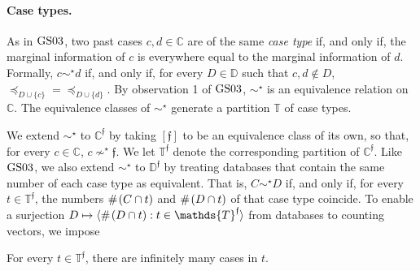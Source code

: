 \documentclass[12pt,a4paper,twoside]{article}
\newcommand{\gsii}{$\textup{GS03}$}
\newcommand{\novel}{\mathfrak f}
\newcommand{\preceqb}{\mathbin{\preceq}}
\newcommand{\countof}{\mathbin{\#}\hskip1pt}
\newcommand{\mbbd}{{\mathds D}}
\newcommand{\mbbdp}{{\mathds D^{\novel}}}
\newcommand{\mbbc}{{\mathds C}}
\newcommand{\mbbcp}{{\mathds C^{\novel}}}
\newcommand{\mbbt}{{\mathds {T}}}
\newcommand{\mbbtp}{{\mathds{T} ^ \novel }}
\begin{document}



\paragraph{Case types.}\hskip-5pt As in \gsii, two past cases $c , d \in \mbbc$
are of the same \emph{case type} if, and only if, the marginal information of
$c$ is everywhere equal to the marginal information of $d$. Formally, $c \sim
^{ \star } d$ if, and only if, for every $D \in \mbbd$ such that $c , d \notin
D$, $\preceqb _ { D \cup \{ c \} } = \preceqb _ { D \cup \{ d \} }$.  By
observation 1 of \gsii, $\sim ^{ \star }$ is an equivalence relation on
$\mbbc$. The equivalence classes of $\sim^\star$ generate a partition $\mbbt$
of case types.

We extend $\sim ^{ \star }$ to $\mbbcp$ by taking $[ \novel ]$ to be an
equivalence class of its own, so that, for every $c \in \mbbc$, $c \nsim ^{
  \star } \novel$.  We let $\mbbtp$ denote the corresponding partition of
$\mbbcp$.  Like \gsii, we also extend $\sim^{\star}$ to $\mbbdp$ by treating
databases that contain the same number of each case type as equivalent. That
is, $C \sim ^{\star } D$ if, and only if, for every $t \in \mbbtp$, the numbers
$\countof (C \cap t)$ and $\countof (D \cap t)$ of that case type coincide. To
enable a surjection $D \mapsto \langle\countof (D \cap t): t \in \mbbtp \rangle$
from databases to counting vectors, we impose



\begin{assumption*}
For every  $t \in \mbbtp$, there are infinitely many cases in $t$.
\end{assumption*}

\end{document}
